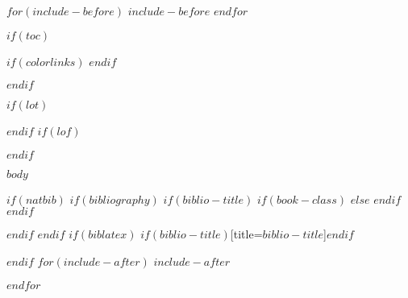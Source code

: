 \documentclass[8pt, a5paper, titlepage, twoside, openright, draft]{memoir}
\begin{document}
\frontmatter

$for(include-before)$
$include-before$
$endfor$


%
%
\thispagestyle{empty}
\vspace*{0em}
\noindent\hspace*{\centeroffset}
\pagebreak

$if(toc)$
{
$if(colorlinks)$
\hypersetup{linkcolor=$if(toccolor)$$toccolor$$else$$endif$}
$endif$
\cleardoublepage
\begin{KeepFromToc} %
  \tableofcontents
\end{KeepFromToc}
\pagebreak
\cleardoublepage
}
$endif$

$if(lot)$
\listoftables
$endif$
$if(lof)$
\listoffigures
$endif$


\mainmatter
$body$

\appendix

\backmatter

$if(natbib)$
$if(bibliography)$
$if(biblio-title)$
$if(book-class)$
\renewcommand\bibname{$biblio-title$}
$else$
\renewcommand\refname{$biblio-title$}
$endif$
$endif$


$endif$
$endif$
$if(biblatex)$
\printbibliography$if(biblio-title)$[title=$biblio-title$]$endif$

$endif$
$for(include-after)$
$include-after$

\printindex

$endfor$
\end{document}
